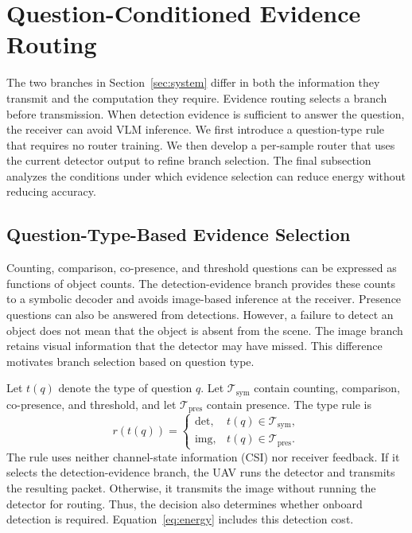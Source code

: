 \section{Question-Conditioned Evidence Routing}\label{sec:routing}

The two branches in Section~\ref{sec:system} differ in both the
information they transmit and the computation they require. Evidence
routing selects a branch before transmission. When detection evidence
is sufficient to answer the question, the receiver can avoid VLM
inference. We first introduce a question-type rule that requires no
router training. We then develop a per-sample router that uses the
current detector output to refine branch selection. The final subsection
analyzes the conditions under which evidence selection can reduce
energy without reducing accuracy.

\subsection{Question-Type-Based Evidence Selection}\label{subsec:rule}

Counting, comparison, co-presence, and threshold questions can be
expressed as functions of object counts. The detection-evidence branch
provides these counts to a symbolic decoder and avoids image-based
inference at the receiver. Presence questions can also be answered
from detections. However, a failure to detect an object does not mean
that the object is absent from the scene. The image branch retains
visual information that the detector may have missed. This difference
motivates branch selection based on question type.

Let $t(q)$ denote the type of question $q$. Let
$\mathcal T_{\mathrm{sym}}$ contain counting, comparison, co-presence,
and threshold, and let $\mathcal T_{\mathrm{pres}}$ contain presence.
The type rule is
\begin{equation}
r(t(q))=
\begin{cases}
\mathrm{det}, & t(q)\in\mathcal T_{\mathrm{sym}},\\
\mathrm{img}, & t(q)\in\mathcal T_{\mathrm{pres}}.
\end{cases}
\label{eq:rule}
\end{equation}
The rule uses neither channel-state information (CSI) nor receiver
feedback. If it selects the detection-evidence branch, the UAV runs
the detector and transmits the resulting packet. Otherwise, it
transmits the image without running the detector for routing. Thus,
the decision also determines whether onboard detection is required.
Equation~\eqref{eq:energy} includes this detection cost.

